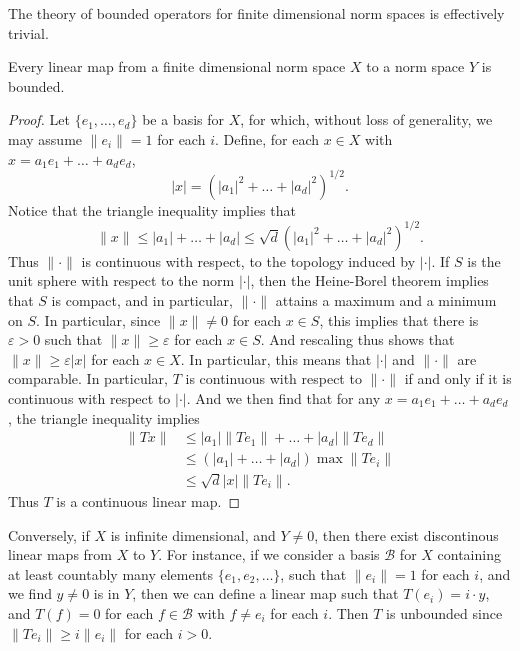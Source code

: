 The theory of bounded operators for finite dimensional norm spaces is effectively trivial.

\begin{theorem}
    Every linear map from a finite dimensional norm space $X$ to a norm space $Y$ is bounded.
\end{theorem}
\begin{proof}
    Let $\{ e_1, \dots, e_d \}$ be a basis for $X$, for which, without loss of generality, we may assume $\| e_i \| = 1$ for each $i$. Define, for each $x \in X$ with $x = a_1e_1 + \dots + a_d e_d$,
    \[ |x| = (|a_1|^2 + \dots + |a_d|^2)^{1/2}. \]
    Notice that the triangle inequality implies that
    \[ \| x \| \leq |a_1| + \dots + |a_d| \leq \sqrt{d} \left( |a_1|^2 + \dots + |a_d|^2 \right)^{1/2}. \]
    Thus $\| \cdot \|$ is continuous with respect, to the topology induced by $|\cdot|$. If $S$ is the unit sphere with respect to the norm $|\cdot|$, then the Heine-Borel theorem implies that $S$ is compact, and in particular, $\| \cdot \|$ attains a maximum and a minimum on $S$. In particular, since $\| x \| \neq 0$ for each $x \in S$, this implies that there is $\varepsilon > 0$ such that $\| x \| \geq \varepsilon$ for each $x \in S$. And rescaling thus shows that $\| x \| \geq \varepsilon |x|$ for each $x \in X$. In particular, this means that $|\cdot|$ and $\| \cdot \|$ are comparable. In particular, $T$ is continuous with respect to $\| \cdot \|$ if and only if it is continuous with respect to $| \cdot |$. And we then find that for any $x = a_1e_1 + \dots + a_de_d$, the triangle inequality implies
    \begin{align*}
        \| Tx \| &\leq |a_1| \| Te_1 \| + \dots + |a_d| \| Te_d \|\\
        &\leq (|a_1| + \dots + |a_d|) \max \| Te_i \|\\
        &\leq \sqrt{d} |x| \| Te_i \|.
    \end{align*}
    Thus $T$ is a continuous linear map.
\end{proof}

Conversely, if $X$ is infinite dimensional, and $Y \neq 0$, then there exist discontinous linear maps from $X$ to $Y$. For instance, if we consider a basis $\mathcal{B}$ for $X$ containing at least countably many elements $\{ e_1, e_2, \dots \}$, such that $\| e_i \| = 1$ for each $i$, and we find $y \neq 0$ is in $Y$, then we can define a linear map such that $T(e_i) = i \cdot y$, and $T(f) = 0$ for each $f \in \mathcal{B}$ with $f \neq e_i$ for each $i$. Then $T$ is unbounded since $\| T e_i \| \geq i \| e_i \|$ for each $i > 0$.

